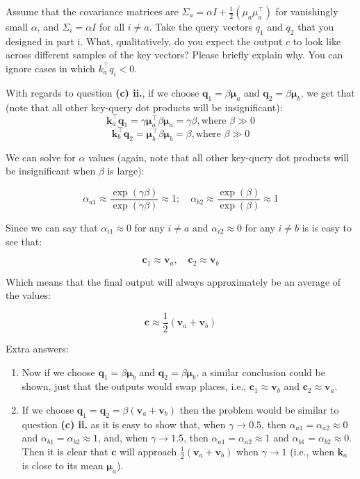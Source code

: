 \begin{parts}
\begin{subparts}
\subpart[2]
Assume that the covariance matrices are $\Sigma_a=\alpha I + \frac{1}{2}(\mu_a\mu_a^\top)$ for vanishingly small $\alpha$, and $\Sigma_i=\alpha I$  for all $i \neq a$.
Take the query vectors $q_1$ and $q_2$ that you designed in part i.
What, qualitatively, do you expect the output $c$ to look like across different samples of the key vectors? Please briefly explain why. You can ignore cases in which $k_a^\top q_i < 0$.

\begin{answer}
    With regards to question \textbf{(c) ii.}, if we choose $\mathbf{q}_1=\beta \mathbf{\mu}_a$ and $\mathbf{q}_2=\beta \mathbf{\mu}_b$, we get that (note that all other key-query dot products will be insignificant):
    $$\mathbf{k}_a^{\top}\mathbf{q}_1=\gamma\mathbf{\mu}_a^{\top}\beta \mathbf{\mu}_a=\gamma\beta, \text{where }\beta \gg 0$$
    $$\mathbf{k}_b^{\top}\mathbf{q}_2=\mathbf{\mu}_b^{\top}\beta \mathbf{\mu}_b=\beta, \text{where }\beta \gg 0$$
    
    We can solve for $\alpha$ values (again, note that all other key-query dot products will be insignificant when $\beta$ is large):
    
    $$\alpha_{a1}\approx\frac{\exp(\gamma\beta)}{\exp(\gamma\beta)}\approx 1;\quad \alpha_{b2}\approx\frac{\exp(\beta)}{\exp(\beta)}\approx 1$$
    
    Since we can say that $\alpha_{i1}\approx 0$ for any $i\ne a$ and $\alpha_{i2}\approx 0$ for any $i\ne b$ is is easy to see that:
    
    $$\mathbf{c}_1\approx \mathbf{v}_a, \quad \mathbf{c}_2\approx \mathbf{v}_b$$
    
    Which means that the final output will always approximately be an average of the values:
    
    $$\mathbf{c}\approx\frac{1}{2}(\mathbf{v}_a+\mathbf{v}_b)$$
    
    Extra answers:
    \begin{enumerate}
        \item Now if we choose $\mathbf{q}_1=\beta \mathbf{\mu}_b$ and $\mathbf{q}_2=\beta \mathbf{\mu}_b$, a similar conclusion could be shown, just that the outputs would swap places, i.e., $\mathbf{c}_1\approx \mathbf{v}_b$ and $\mathbf{c}_2\approx \mathbf{v}_a$.
        \item If we choose $\mathbf{q}_1=\mathbf{q}_2=\beta(\mathbf{v}_a+\mathbf{v}_b)$ then the problem would be similar to question \textbf{(c) ii.} as it is easy to show that, when $\gamma\to 0.5$, then $\alpha_{a1}=\alpha_{a2}\approx 0$ and $\alpha_{b1}=\alpha_{b2}\approx 1$, and, when $\gamma\to 1.5$, then $\alpha_{a1}=\alpha_{a2}\approx 1$ and $\alpha_{b1}=\alpha_{b2}\approx 0$. Then it is clear that $\mathbf{c}$ will approach $\frac{1}{2}(\mathbf{v}_a+\mathbf{v}_b)$ when $\gamma\to 1$ (i.e., when $\mathbf{k}_a$ is close to its mean $\mathbf{\mu}_{a}$).
    \end{enumerate}
\end{answer}



\end{subparts}
\end{parts}